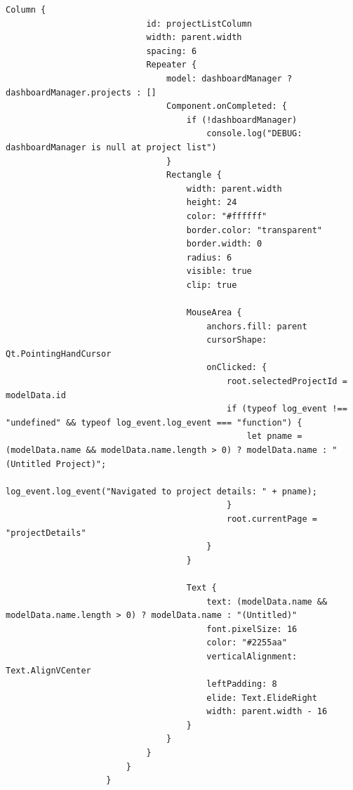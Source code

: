 \documentclass{report}
\begin{document}
\begin{lstlisting}[style=qmlstyle]
                        Column {
                            id: projectListColumn
                            width: parent.width
                            spacing: 6
                            Repeater {
                                model: dashboardManager ? dashboardManager.projects : []
                                Component.onCompleted: {
                                    if (!dashboardManager)
                                        console.log("DEBUG: dashboardManager is null at project list")
                                }
                                Rectangle {
                                    width: parent.width
                                    height: 24
                                    color: "#ffffff"
                                    border.color: "transparent"
                                    border.width: 0
                                    radius: 6
                                    visible: true
                                    clip: true
        
                                    MouseArea {
                                        anchors.fill: parent
                                        cursorShape: Qt.PointingHandCursor
                                        onClicked: {
                                            root.selectedProjectId = modelData.id
                                            if (typeof log_event !== "undefined" && typeof log_event.log_event === "function") {
                                                let pname = (modelData.name && modelData.name.length > 0) ? modelData.name : "(Untitled Project)";
                                                log_event.log_event("Navigated to project details: " + pname);
                                            }
                                            root.currentPage = "projectDetails"
                                        }
                                    }
        
                                    Text {
                                        text: (modelData.name && modelData.name.length > 0) ? modelData.name : "(Untitled)"
                                        font.pixelSize: 16
                                        color: "#2255aa"
                                        verticalAlignment: Text.AlignVCenter
                                        leftPadding: 8
                                        elide: Text.ElideRight
                                        width: parent.width - 16
                                    }
                                }
                            }
                        }
                    }


\end{lstlisting}
\end{document}
